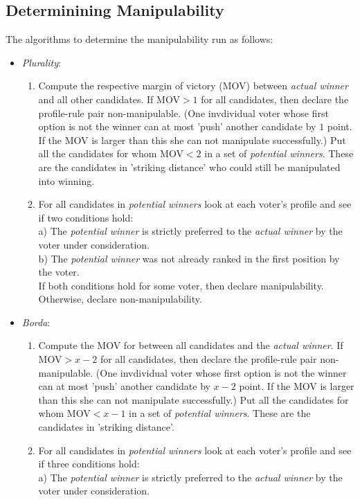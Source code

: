 \documentclass[10pt,a4paper]{article}
\begin{document}
\subsection{Determinining Manipulability}
\noindent The algorithms to determine the manipulability run as follows:\\
\begin{itemize}
\item \textit{Plurality}: \begin{enumerate}
\item  Compute the respective margin of victory (MOV) between \textit{actual winner} and all other candidates. If MOV$>1$ for all candidates, then declare the profile-rule pair non-manipulable. (One invdividual voter whose first option is not the winner can at most 'push' another candidate by $1$ point. If the MOV is larger than this she can not manipulate successfully.) Put all the candidates for whom MOV$<2$ in a set of \textit{potential winners}. These are the candidates in 'striking distance' who could still be manipulated into winning.
\item For all candidates in \textit{potential winners} look at each voter's profile and see if two conditions hold: \\
a) The \textit{potential winner} is strictly preferred to the \textit{actual winner} by the voter under consideration. \\
b) The \textit{potential winner} was not already ranked in the first position by the voter. \\
If both conditions hold for some voter, then declare manipulability. Otherwise, declare non-manipulability.
\end{enumerate}
\item \textit{Borda}: \begin{enumerate}
\item Compute the MOV for between all candidates and the \textit{actual winner}. If MOV$>x-2$ for all candidates, then declare the profile-rule pair non-manipulable. (One invdividual voter whose first option is not the winner can at most 'push' another candidate by $x-2$ point. If the MOV is larger than this she can not manipulate successfully.) Put all the candidates for whom MOV$<x-1$ in a set of \textit{potential winners}. These are the candidates in 'striking distance'.
\item For all candidates in \textit{potential winners} look at each voter's profile and see if three conditions hold: \\
a) The \textit{potential winner} is strictly preferred to the \textit{actual winner} by the voter under consideration. \\

\end{enumerate}
\end{itemize}
\end{document}
